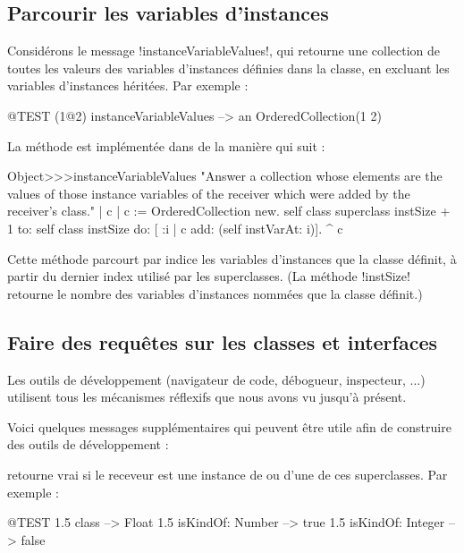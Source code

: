 \documentclass[a4paper,10pt,twoside]{book}
\begin{document}
\subsection{Parcourir les variables d'instances}

Considérons le message \ct!instanceVariableValues!, qui retourne une collection de toutes les valeurs des variables d'instances définies dans la classe, en excluant les variables d'instances héritées.
Par exemple :
\begin{code}{@TEST}
(1@2) instanceVariableValues --> an OrderedCollection(1 2)
\end{code}

La méthode est implémentée dans  de la manière qui suit :
\begin{code}{}
Object>>>instanceVariableValues
	"Answer a collection whose elements are the values of those instance variables of the receiver which were added by the receiver's class."	
	| c |
	c := OrderedCollection new.
	self class superclass instSize + 1
		to: self class instSize
		do: [ :i | c add: (self instVarAt: i)].
	^ c
\end{code}

Cette méthode parcourt par indice les variables d'instances que la classe définit, à partir du dernier index utilisé par les superclasses.
(La méthode \ct!instSize! retourne le nombre des variables d'instances nommées que la classe définit.)

\subsection{Faire des requêtes sur les classes et interfaces}

Les outils de développement \pharo (navigateur de code, débogueur, inspecteur, ...) utilisent tous les mécanismes réflexifs que nous avons vu jusqu'à présent.

Voici quelques messages supplémentaires qui peuvent être utile afin de construire des outils de développement :

 retourne vrai si le receveur est une instance de  ou d'une de ces superclasses.
Par exemple :
\begin{code}{@TEST}
1.5 class                     --> Float
1.5 isKindOf: Number --> true
1.5 isKindOf: Integer   --> false
\end{code}
\end{document}
